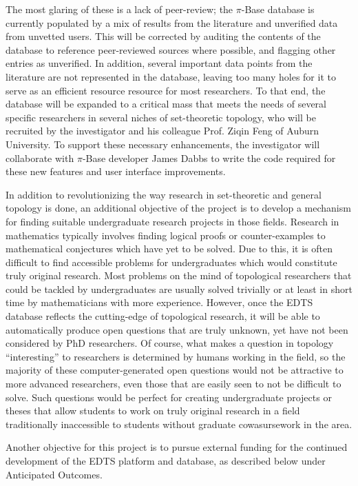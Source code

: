 \documentclass[10pt]{article}
\begin{document}
The most glaring of these is a lack of
peer-review; the \(\pi\)-Base database is currently populated by a mix of
results from
the literature and unverified data from unvetted users. This will be
corrected by auditing the contents of the database to reference peer-reviewed
sources where possible, and flagging other entries as unverified.
In addition, several important data points from the literature are not
represented in the database, leaving too many holes for it to serve as
an efficient resource resource for most researchers.
To that end, the database will be expanded to a critical mass that meets the
needs of several specific researchers in several niches of set-theoretic
topology, who will be recruited by the investigator and his colleague Prof.
Ziqin Feng of Auburn University. To support these necessary enhancements,
the investigator will collaborate with \(\pi\)-Base developer James Dabbs to
write the code required for these new features and user interface improvements.

In addition to revolutionizing the way research in set-theoretic and general
topology is done, an additional objective of the project is to develop
a mechanism for finding suitable undergraduate research projects in those
fields. Research in mathematics typically involves finding logical proofs or
counter-examples to mathematical conjectures which have yet to be solved. Due
to this, it is often difficult to find
accessible problems for undergraduates which would constitute
truly original research. Most problems on the mind of topological researchers
that could be tackled by undergraduates
are usually solved trivially or at least in short time by mathematicians with
more experience. However, once the EDTS database reflects the cutting-edge
of topological research, it will be able to
automatically produce open questions that are
truly unknown, yet have not been considered by PhD researchers. Of course,
what makes a question in topology ``interesting'' to researchers is determined
by humans working in the field, so the majority of these
computer-generated open questions
would not be attractive to more advanced researchers, even those that are
easily seen to not be difficult to solve. Such questions
would be perfect for
creating undergraduate projects or theses that allow students to work on
truly original research in a field traditionally inaccessible to students
without graduate cowasursework in the area.

Another objective for this project is to pursue external funding for the
continued development of the EDTS platform and database, as described below
under Anticipated Outcomes.
\end{document}
